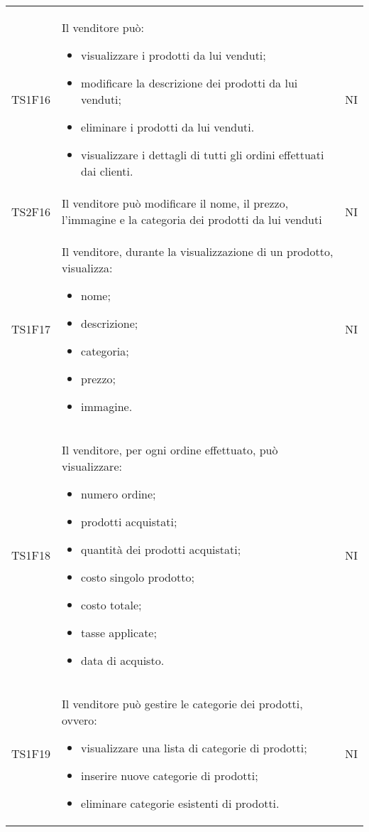 {\begin{longtable}{C{3cm} C{10.2cm} C{1.5cm}}
TS1F16 & Il venditore può:
\begin{itemize}
	\item visualizzare i prodotti da lui venduti;
	\item modificare la descrizione dei prodotti da lui venduti;
	\item eliminare i prodotti da lui venduti.
	\item visualizzare i dettagli di tutti gli ordini effettuati dai clienti.
\end{itemize} & NI\\

TS2F16 & Il venditore può modificare il nome, il prezzo, l'immagine e la categoria dei prodotti da lui venduti & NI\\

TS1F17 & Il venditore, durante la visualizzazione di un prodotto, visualizza:
\begin{itemize}
	\item nome;
	\item descrizione;
	\item categoria;
	\item prezzo;
	\item immagine.
\end{itemize} & NI\\

TS1F18 & Il venditore, per ogni ordine effettuato, può visualizzare:
\begin{itemize}
	\item numero ordine;
	\item prodotti acquistati;
	\item quantità dei prodotti acquistati;
	\item costo singolo prodotto;
	\item costo totale;
	\item tasse applicate;
	\item data di acquisto.
\end{itemize}
& NI\\

TS1F19 & Il venditore può gestire le categorie dei prodotti, ovvero:
\begin{itemize}
	\item visualizzare una lista di categorie di prodotti;
	\item inserire nuove categorie di prodotti;
	\item eliminare categorie esistenti di prodotti.
\end{itemize}
& NI\\






\end{longtable}}
